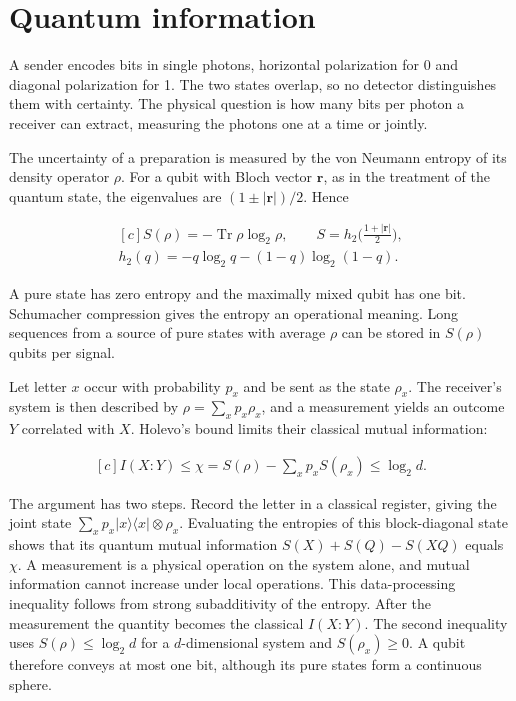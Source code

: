 \documentclass[11pt,oneside]{book}
\newenvironment{centeredalign}{\[\begin{gathered}[c]}{\end{gathered}\]}
\begin{document}
\clearpage

\section{Quantum information}

\label{topic:quantum-information}

A sender encodes bits in single photons, horizontal polarization for 0 and diagonal polarization for 1. The two states overlap, so no detector distinguishes them with certainty. The physical question is how many bits per photon a receiver can extract, measuring the photons one at a time or jointly.

The uncertainty of a preparation is measured by the von Neumann entropy of its density operator \(\rho\). For a qubit with Bloch vector \(\mathbf r\), as in the treatment of the quantum state, the eigenvalues are \((1\pm|\mathbf r|)/2\). Hence

\begin{centeredalign}
S(\rho)=-\operatorname{Tr}\rho\log_2\rho,\qquad S=h_2\Big(\frac{1+|\mathbf r|}{2}\Big),\\
h_2(q)=-q\log_2q-(1-q)\log_2(1-q).
\end{centeredalign}

A pure state has zero entropy and the maximally mixed qubit has one bit. Schumacher compression gives the entropy an operational meaning. Long sequences from a source of pure states with average \(\rho\) can be stored in \(S(\rho)\) qubits per signal.

Let letter \(x\) occur with probability \(p_x\) and be sent as the state \(\rho_x\). The receiver's system is then described by \(\rho=\sum_xp_x\rho_x\), and a measurement yields an outcome \(Y\) correlated with \(X\). Holevo's bound limits their classical mutual information:

\begin{centeredalign}
I(X{:}Y)\leq\chi=S(\rho)-\sum_xp_xS(\rho_x)\leq\log_2d.
\end{centeredalign}

The argument has two steps. Record the letter in a classical register, giving the joint state \(\sum_xp_x|x\rangle\langle x|\otimes\rho_x\). Evaluating the entropies of this block-diagonal state shows that its quantum mutual information \(S(X)+S(Q)-S(XQ)\) equals \(\chi\). A measurement is a physical operation on the system alone, and mutual information cannot increase under local operations. This data-processing inequality follows from strong subadditivity of the entropy. After the measurement the quantity becomes the classical \(I(X{:}Y)\). The second inequality uses \(S(\rho)\leq\log_2d\) for a \(d\)-dimensional system and \(S(\rho_x)\geq0\). A qubit therefore conveys at most one bit, although its pure states form a continuous sphere.
\end{document}
